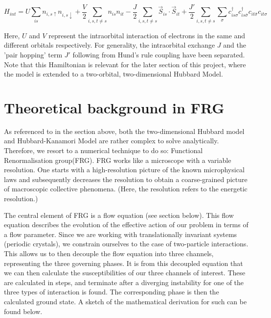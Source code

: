 \documentclass[12pt]{article}
\begin{document}
\begin{equation} \label{Hubbard-Kanamori Model}
    H_{int} = U \sum_{is}n_{i,s\uparrow}n_{i,s\downarrow} + \frac{V}{2} \sum_{i,s,t \neq s} n_{is}n_{it} -\frac{J}{2} \sum_{i,s,t \neq s} \vec{S}_{is} \cdot \vec{S}_{it} 
    + \frac{J'}{2} \sum_{i,s,t \neq s} \sum_{\sigma} c_{is\sigma}^{\dagger}c_{is\bar{\sigma}}^{\dagger}c_{it\bar{\sigma}}c_{it\sigma}
\end{equation}

Here, $U$ and $V$ represent the intraorbital interaction of electrons in the same and different orbitals respectively. For generality, the intraorbital exchange $J$ and the 'pair hopping' term $J'$ following from Hund's rule coupling have been separated.  
Note that this Hamiltonian is relevant for the later section of this project, where the model is extended to a two-orbital, two-dimensional Hubbard Model.


\section{Theoretical background in FRG}

As referenced to in the section above, both the two-dimensional Hubbard model and Hubbard-Kanamori Model are rather complex to solve analytically. Therefore, we resort to a numerical technique to do so: Functional Renormalisation group(FRG). 
FRG works like a microscope with a variable resolution. One starts with a high-resolution picture of the known microphysical laws and subsequently decreases the resolution to obtain a coarse-grained picture of macroscopic collective phenomena. (Here, the resolution refers to the energetic resolution.) 


The central element of FRG is a flow equation (see section below). This flow equation describes the evolution of the effective action of our problem in terms of a flow parameter. Since we are working with translationally invariant systems (periodic crystals), we constrain ourselves to the case of two-particle interactions. This allows us to then decouple the flow equation into three channels, representing the three governing phases.
It is from this decoupled equation that we can then calculate the susceptibilities of our three channels of interest. These are calculated in steps, and terminate after a diverging instability for one of the three types of interaction is found. The corresponding phase is then the calculated ground state. A sketch of the mathematical derivation for such can be found below. 
\end{document}
